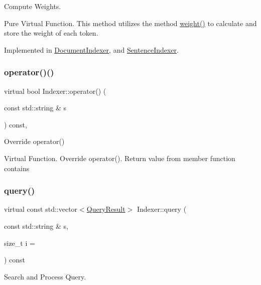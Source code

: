 Compute Weights. 

Pure Virtual Function. This method utilizes the method \hyperlink{class_indexer_a8301fcbdf40afd926ab71d4767575d32}{weight()} to calculate and store the weight of each token. 

Implemented in \hyperlink{class_document_indexer_a5e0aeb92576847e9462670693cb0737c}{Document\+Indexer}, and \hyperlink{class_sentence_indexer_ae038d36081439a5107821ac48a318d66}{Sentence\+Indexer}.

\mbox{\label{class_indexer_aa2be6d79e0425aafd10b98118fcbb4ee}} 
\subsubsection{\texorpdfstring{operator()()}{operator()()}}
{\footnotesize\ttfamily virtual bool Indexer\+::operator() (\begin{DoxyParamCaption}\item[{const std\+::string \&}]{s }\end{DoxyParamCaption}) const\hspace{0.3cm}{\ttfamily [inline]}, {\ttfamily [virtual]}}



Override operator() 

Virtual Function. Override operator(). Return value from member function contains \mbox{\label{class_indexer_a8d98ba740db6f5f8521d557bf908aead}} 
\subsubsection{\texorpdfstring{query()}{query()}}
{\footnotesize\ttfamily virtual const std\+::vector$<$\hyperlink{class_query_result}{Query\+Result}$>$ Indexer\+::query (\begin{DoxyParamCaption}\item[{const std\+::string \&}]{s,  }\item[{size\+\_\+t}]{i = {} }\end{DoxyParamCaption}) const\hspace{0.3cm}{\ttfamily [pure virtual]}}



Search and Process Query. 

